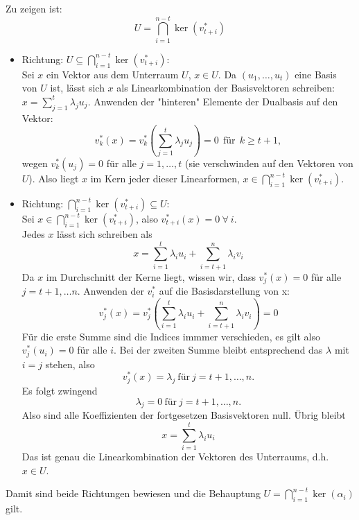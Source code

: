\documentclass[a4paper,12pt]{article}
\begin{document}
Zu zeigen ist:
$$
\boxed{U = \bigcap_{i=1}^{n-t} \ker(v_{t+i}^*)}
$$
\begin{itemize}
 \item Richtung: $U \subseteq  \bigcap_{i=1}^{n-t} \ker(v_{t+i}^*)$: \\
Sei $x$ ein Vektor aus dem Unterraum $U$, $x \in U$. Da $(u_1, \ldots, u_t)$ eine Basis von $U$ ist, lässt sich $x$ als Linearkombination der Basisvektoren schreiben:
$x = \sum_{j=1}^t \lambda_j u_j$.
Anwenden der "hinteren" Elemente der Dualbasis auf den Vektor:
$$v_k^*(x)=v_k^*(\sum_{j=1}^t \lambda_ju_j)=0 \ \ \text{für} \ \  k \geq t+1,$$
wegen $v_k^*(u_j) = 0$ für alle $j = 1, \ldots, t$ (sie verschwinden auf den Vektoren von $U$). Also liegt $x$ im Kern jeder dieser Linearformen, $x \in \bigcap_{i=1}^{n-t} \ker(v_{t+i}^*)$. \\

 \item Richtung: $ \bigcap_{i=1}^{n-t}\ker(v_{t+i}^*) \subseteq U$: \\
 Sei $x \in \bigcap_{i=1}^{n-t}\ker(v_{t+i}^*)$, also $v_{t+i}^*(x) = 0  \ \forall \ i$. \\
 Jedes $x$ lässt sich schreiben als
 $$x=\sum_{i=1}^t \lambda_iu_i+\sum_{i=t+1}^n\lambda_iv_i$$
 Da $x$ im Durchschnitt der Kerne liegt, wissen wir, dass $v_j^*(x)=0$ für alle $j=t+1, \ldots n$.
 Anwenden der $v_i^*$ auf die Basisdarstellung von x:
 $$v_j^*(x) =v_j^*(\sum_{i=1}^t \lambda_iu_i+\sum_{i=t+1}^n\lambda_iv_i) =0$$
 Für die erste Summe sind die Indices immmer verschieden, es gilt also $v_j^*(u_i) = 0$ für alle $i$. Bei der zweiten Summe bleibt entsprechend das $\lambda$ mit $i=j$ stehen, also
 $$v_j^*(x) = \lambda_j \ \text{für} \ j=t+1, \ldots, n.$$
 Es folgt zwingend
 $$\lambda_j = 0 \ \text{für} \ j=t+1, \ldots, n.$$
Also sind alle Koeffizienten der fortgesetzen Basisvektoren null. Übrig bleibt
$$x = \sum_{i=1}^t \lambda_i u_i$$
Das ist genau die Linearkombination der Vektoren des Unterraums, d.h. $x \in U$.
\end{itemize}
Damit sind beide Richtungen bewiesen und die Behauptung $U = \bigcap_{i=1}^{n-t} \ker(\alpha_i)$ gilt.
\end{document}
